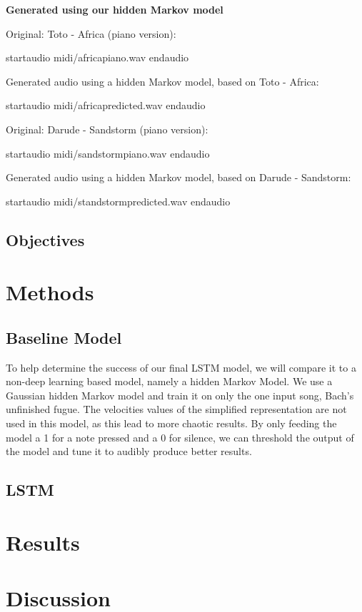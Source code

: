 \documentclass[11pt, twocolumn]{article}
\begin{document}
\ifpdf
\else
\textbf{Generated using our hidden Markov model}

Original: Toto - Africa (piano version):

startaudio midi/africapiano.wav endaudio

Generated audio using a hidden Markov model, based on Toto - Africa:

startaudio midi/africapredicted.wav endaudio

Original: Darude - Sandstorm (piano version):

startaudio midi/sandstormpiano.wav endaudio

Generated audio using a hidden Markov model, based on Darude - Sandstorm:

startaudio midi/standstormpredicted.wav endaudio
\fi
    
\subsection{Objectives}


\section{Methods}

\subsection{Baseline Model}
To help determine the success of our final LSTM model, we will compare it to a non-deep learning based model, namely a hidden Markov Model. We use a Gaussian hidden Markov model and train it on only the one input song, Bach's unfinished fugue. The velocities values of the simplified representation are not used in this model, as this lead to more chaotic results. By only feeding the model a 1 for a note pressed and a 0 for silence, we can threshold the output of the model and tune it to audibly produce better results.
\subsection{LSTM}

\lipsum[1-5]


\section{Results}
\section{Discussion}
 



\end{document}

